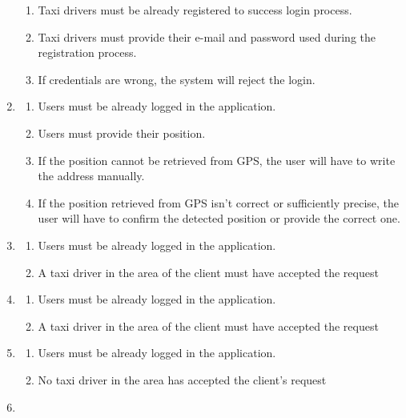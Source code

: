 \documentclass[a4paper]{article}
\begin{document}
\begin{enumerate}[label=\bfseries G\arabic*:]
\begin{enumerate}[label=\bfseries R\arabic*:]
        \item Taxi drivers must be already registered to success login process.
        \item Taxi drivers must provide their e-mail and password used during the registration process.
        \item If credentials are wrong, the system will reject the login.
        \end{enumerate}
    \item
        \begin{enumerate}[label=\bfseries R\arabic*:]
        \item Users must be already logged in the application.
        \item Users must provide their position.
        \item If the position cannot be retrieved from GPS, the user will have to write the address manually.
        \item If the position retrieved from GPS isn't correct or sufficiently precise, the user will have to confirm the detected position or provide the correct one.
        \end{enumerate}
    \item
        \begin{enumerate}[label=\bfseries R\arabic*:]
        \item Users must be already logged in the application.
        \item A taxi driver in the area of the client must have accepted the request
        \end{enumerate}
    \item
        \begin{enumerate}[label=\bfseries R\arabic*:]
        \item Users must be already logged in the application.
        \item A taxi driver in the area of the client must have accepted the request
        \end{enumerate}
    \item
        \begin{enumerate}[label=\bfseries R\arabic*:]
        \item Users must be already logged in the application.
        \item No taxi driver in the area has accepted the client's request
        \end{enumerate}
    \item
        \begin{enumerate}[label=\bfseries R\arabic*:]

\end{enumerate}
\end{enumerate}
\end{document}
